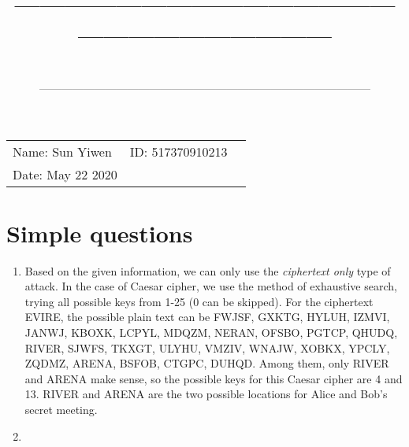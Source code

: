 \documentclass[a4paper]{article}
\title{—————————————————————————\\ \sc{UM-SJTU Joint Institute}}
\author{\sc{Introduction to Cryptography}}
\date{\sc{(Ve475)}\\——————————————————————————————}
\begin{document}
\maketitle
\vspace{4cm}
\centerline{\Large{}}
\vspace{7cm}
\begin{tabular}{lll}
\qquad \qquad Name: Sun Yiwen&ID: 517370910213\\
\qquad \qquad Date: May 22 2020
\end{tabular}

\newpage
\section{Simple questions}
\begin{enumerate}
\item
Based on the given information, we can only use the \emph{ciphertext only} type of attack. In the case of Caesar cipher, we use the method of exhaustive search, trying all possible keys from 1-25 (0 can be skipped). For the ciphertext EVIRE, the possible plain text can be FWJSF, GXKTG, HYLUH, IZMVI, JANWJ, KBOXK, LCPYL, MDQZM, NERAN, OFSBO, PGTCP, QHUDQ, RIVER, SJWFS, TKXGT, ULYHU, VMZIV, WNAJW, XOBKX, YPCLY, ZQDMZ, ARENA, BSFOB, CTGPC, DUHQD. Among them, only RIVER and ARENA make sense, so the possible keys for this Caesar cipher are 4 and 13. RIVER and ARENA are the two possible locations for Alice and Bob's secret meeting.
\item


\end{enumerate}
\end{document}
